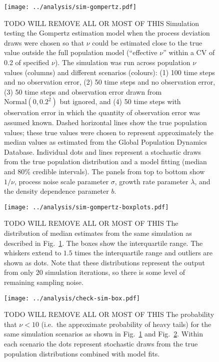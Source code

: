 \clearpage

\begin{figure}[htbp]
\begin{center}
\texttt{[image: ../analysis/sim-gompertz.pdf]}
\caption{
TODO WILL REMOVE ALL OR MOST OF THIS
  Simulation testing the Gompertz estimation model when the process deviation
  draws were chosen so that $\nu$ could be estimated close to the true value
  outside the full population model (``effective $\nu$'' within a CV of 0.2 of
  specified $\nu$). The simulation was run across population $\nu$ values
  (columns) and different scenarios (colours): (1) 100 time steps and no
  observation error, (2) 50 time steps and no observation error, (3) 50 time
  steps and observation error drawn from $\mathrm{Normal} (0, 0.2^2)$ but
  ignored, and (4) 50 time steps with observation error in which the quantity
  of observation error was assumed known. Dashed horizontal lines show the true
  population values; these true values were chosen to represent approximately
  the median values as estimated from the Global Population Dynamics Database.
  Individual dots and lines
  represent a stochastic draws from the true population distribution and
  a model fitting (median and 80\% credible intervals). The panels from top to
  bottom show $1/\nu$, process noise scale parameter $\sigma$, growth rate
  parameter $\lambda$, and the density dependence parameter $b$.
}
\label{fig:sim-gompertz}
\end{center}
\end{figure}

\clearpage

\begin{figure}[htbp]
\begin{center}
\texttt{[image: ../analysis/sim-gompertz-boxplots.pdf]}
\caption{
TODO WILL REMOVE ALL OR MOST OF THIS
  The distribution of median estimates from the same simulation as described in
  Fig.~\ref{fig:sim-gompertz}. The boxes show the interquartile range. The
  whiskers extend to $1.5$ times the interquartile range and outliers are shown
  as dots. Note that these distributions represent the output from only 20
  simulation iterations, so there is some level of remaining sampling noise.
}
\label{fig:sim-gompertz-boxplots}
\end{center}
\end{figure}

\clearpage

\begin{figure}[htbp]
\begin{center}
\texttt{[image: ../analysis/check-sim-box.pdf]}
\caption{
TODO WILL REMOVE ALL OR MOST OF THIS
  The probability that $\nu < 10$ (i.e.\ the approximate probability of heavy
  tails) for the same simulation scenarios as shown in
  Fig.~\ref{fig:sim-gompertz} and Fig.~\ref{fig:sim-gompertz-boxplots}. Within
  each scenario the dots represent stochastic draws from the true population
  distributions combined with model fits.
}
\label{fig:sim-prob}
\end{center}
\end{figure}

